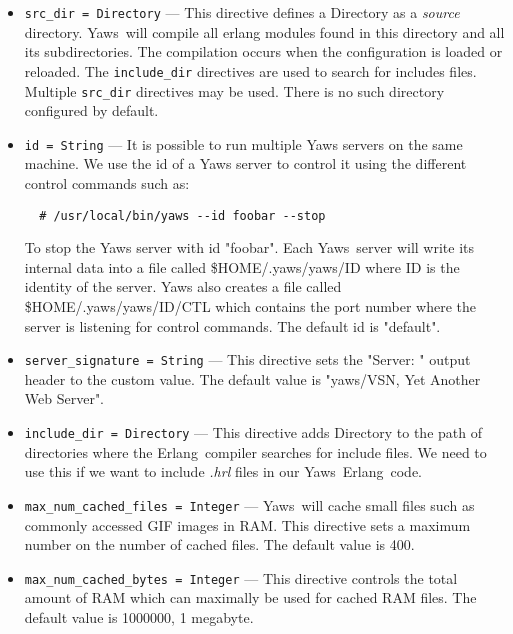 \documentclass[11pt,oneside,english]{book}
\newcommand{\Erlang}            %
        {{\sc Erlang}}
\newcommand{\Yaws}            %
        {{\sc Yaws}}
\begin{document}
\begin{itemize}
\item        \verb+src_dir = Directory+ ---
              This directive defines a Directory as a \textit{source} directory.
              \Yaws\ will compile all erlang modules found in this directory and
              all its subdirectories. The compilation occurs when the
              configuration is loaded or reloaded. The \verb+include_dir+
              directives are used to search for includes files. Multiple
              \verb+src_dir+ directives may be used. There is no such directory
              configured by default.

\item        \verb+id = String+ ---
              It is possible to run multiple Yaws servers on the same machine. We
              use the id of a Yaws server to control it using the different
              control commands such as:
\begin{verbatim}
  # /usr/local/bin/yaws --id foobar --stop
\end{verbatim}
               To stop the Yaws server with id "foobar". Each \Yaws\ server will
               write its internal data into a file called \$HOME/.yaws/yaws/ID
               where ID is the identity of the server. Yaws also creates a file
               called \$HOME/.yaws/yaws/ID/CTL which contains the port
               number where the server is listening for control commands. The
               default id is "default".

\item        \verb+server_signature = String+ ---
              This directive sets the "Server: " output header to the custom
              value. The default value is "yaws/VSN, Yet Another Web Server".

\item        \verb+include_dir = Directory+ ---
              This directive adds Directory to the path of directories
               where  the  \Erlang\   compiler  searches  for
              include  files.  We  need to use this if we want to
              include \textit{.hrl} files in our \Yaws\  \Erlang\  code.

\item        \verb+max_num_cached_files = Integer+ ---
              \Yaws\   will  cache  small  files  such  as  commonly
              accessed  GIF images in RAM.  This directive sets a
              maximum number on the number of cached files.   The
              default value is 400.

\item        \verb+max_num_cached_bytes = Integer+ ---
              This  directive  controls  the  total amount of RAM
              which can maximally be used for cached  RAM  files.
              The default value is 1000000, 1 megabyte.


\end{itemize}
\end{document}
